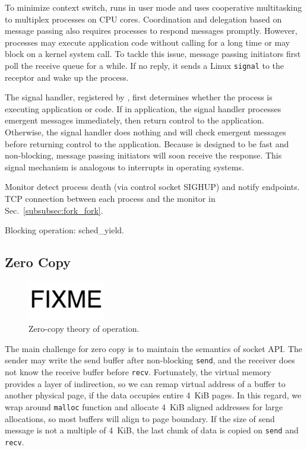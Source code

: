 To minimize context switch, \sys{} runs in user mode and uses cooperative multitasking to multiplex processes on CPU cores. Coordination and delegation based on message passing also requires processes to respond messages promptly. However, processes may execute application code without calling \libipc for a long time or may block on a kernel system call. To tackle this issue, message passing initiators first poll the receive queue for a while. If no reply, it sends a Linux \texttt{signal} to the receptor and wake up the process.

The signal handler, registered by \libipc, first determines whether the process is executing application or \libipc code. If in application, the signal handler processes emergent messages immediately, then return control to the application. Otherwise, the signal handler does nothing and \libipc will check emergent messages before returning control to the application. Because \libipc is designed to be fast and non-blocking, message passing initiators will soon receive the response. This signal mechanism is analogous to interrupts in operating systems.


Monitor detect process death (via control socket SIGHUP) and notify endpoints.
TCP connection between each process and the monitor in Sec.~\ref{subsubsec:fork_fork}.

Blocking operation: sched\_yield.


\subsection{Zero Copy}
\label{subsec:zerocopy}

\begin{figure}[t]
	\centering
	\includegraphics[width=0.3\textwidth]{images/fixme}
	\caption{Zero-copy theory of operation.}
	\label{fig:zerocopy}
\end{figure}

The main challenge for zero copy is to maintain the semantics of socket API. The sender may write the send buffer after non-blocking \texttt{send}, and the receiver does not know the receive buffer before \texttt{recv}.
Fortunately, the virtual memory provides a layer of indirection, so we can remap virtual address of a buffer to another physical page, if the data occupies entire 4~KiB pages.
In this regard, we wrap around \texttt{malloc} function and allocate 4~KiB aligned addresses for large allocations, so most buffers will align to page boundary.
If the size of send message is not a multiple of 4~KiB, the last chunk of data is copied on \texttt{send} and \texttt{recv}.

